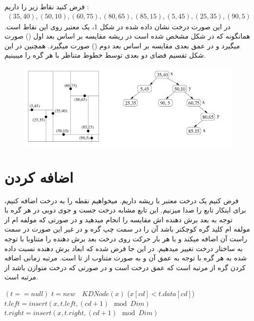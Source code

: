 \documentclass[11pt]{article}
\begin{document}
\begin{example}
فرض کنید نقاط زیر را داریم :
\begin{align*}
    (35,40),(50,10),(60,75),(80,65), (85,15) , (5, 45), (25,35), (90, 5)
\end{align*}
    در این صورت درخت نشان داده شده در شکل 1، یک 
    معتبر روی این نقاط است. همانگونه که در شکل مشخص شده است در ریشه مقایسه بر اساس بعد اول
    ()
    صورت میگیرد و در عمق بعدی مقایسه بر اساس بعد دوم 
    ()
    صورت میگیرد. همچنین در این شکل تقسیم فضای دو بعدی توسط خطوط متناظر با هر گره را میبینیم.
\begin{figure}[h]
    \includegraphics[scale=0.5]{fig1.PNG}
    \caption{}
    \centering
\end{figure}
\end{example} 
\section{اضافه کردن}
فرض کنیم یک درخت 
معتبر با ریشه
داریم. میخواهیم نقطه 
را به درخت اضافه کنیم، برای اینکار تابع 
را صدا میزنیم. این تابع مشابه درخت جست و جوی دویی در هر گره با توجه به بعد برش دهنده اش 
مقایسه را انجام میدهید و در صورتی که مولفه 
ام 
از مولفه 
ام کلید گره کوچکتر باشد آن را در سمت چپ گره و در غیر این صورت در سمت راست آن اضافه میکند و با هر بار حرکت روی درخت بعد برش دهنده را متناوبا با توجه به ساختار درخت تغییر میدهیم. در این جا فرض شده که ابعاد برش دهنده نسبت داده شده به هر گره با توجه به عمق آن و به صورت متناوب از 
تا 
است.
مرتبه زمانی اضافه کردن گره از مرتبه 
است که 
عمق درخت است و در صورتی که درخت متوازن باشد 
از مرتبه 
است. 
\begin{latin}
\begin{codebox}
\li \If $(t == null)$ 
\li \Do $t = new \quad KDNode(x)$
\li
\Else \If ($x[cd] < t.data[cd]$)
\li $t.left = insert(x, t.left, (cd+1) \mod Dim)$
\li \Else 
\li $t.right = insert(x, t.right, (cd+1) \mod Dim)$
\End
\li \Return
\end{codebox}
\end{latin}
\end{document}
